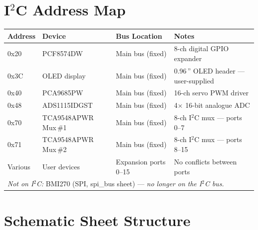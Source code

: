 \documentclass[11pt,a4paper]{article}
\begin{document}
\appendix

\section{\texorpdfstring{I$^2$C}{I2C} Address Map}

\begin{longtable}{p{2.5cm} p{3.5cm} p{3cm} p{6cm}}
  \toprule
  \rowcolor{headergray}\color{white}\textbf{Address} &
  \color{white}\textbf{Device} &
  \color{white}\textbf{Bus Location} &
  \color{white}\textbf{Notes} \\
  \midrule\endhead
  0x20 & PCF8574DW         & Main bus (fixed) & 8-ch digital GPIO expander \\
  0x3C & OLED display       & Main bus (fixed) & 0.96\,'' OLED header --- user-supplied \\
  0x40 & PCA9685PW         & Main bus (fixed) & 16-ch servo PWM driver \\
  0x48 & ADS1115IDGST      & Main bus (fixed) & 4$\times$ 16-bit analogue ADC \\
  0x70 & TCA9548APWR Mux\,\#1 & Main bus (fixed) & 8-ch I$^2$C mux --- ports 0--7 \\
  0x71 & TCA9548APWR Mux\,\#2 & Main bus (fixed) & 8-ch I$^2$C mux --- ports 8--15 \\
  Various & User devices   & Expansion ports 0--15 & No conflicts between ports \\
  \midrule
  \multicolumn{4}{l}{\textit{Not on I$^2$C:} BMI270 (SPI, spi\_bus sheet) --- \textit{no longer on the I$^2$C bus.}} \\
  \bottomrule
\end{longtable}

\section{Schematic Sheet Structure}
\end{document}
